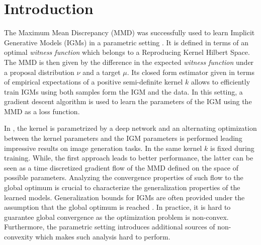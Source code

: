 \section{Introduction}

The Maximum Mean Discrepancy (MMD) \cite{gretton2012kernel} was successfully used to learn Implicit Generative Models (IGMs) in a parametric setting \cite{gen-mmd,Li:2015,Li:2017a,cramer-gan,Binkowski:2018,Arbel:2018}. It is defined in terms of an optimal \textit{witness function} which belongs to a Reproducing Kernel Hilbert Space. The MMD is then given by the difference in the expected \textit{witness function} under a proposal distribution $\nu$ and a target $\mu$. Its closed form estimator given in terms of empirical expectations of a positive semi-definite kernel $k$ allows to efficiently train IGMs using both samples form the IGM and the data. In this setting, a gradient descent algorithm is used to learn the parameters of the IGM using the MMD as a loss function.

In \cite{Li:2017a,Binkowski:2018,Arbel:2018}, the kernel is parametrized by a deep network and an alternating optimization between the kernel parameters and the IGM parameters is performed leading impressive results on image generation tasks. In \cite{gen-mmd,Li:2015} the same kernel $k$ is fixed during training. While, the first approach leads to better performance,  the latter can be seen as a time discretized gradient flow of the MMD defined on the space of possible parameters. Analyzing the convergence properties of such flow to the global optimum is crucial to characterize the generalization properties of the learned models. 
Generalization bounds for IGMs are often provided under the assumption that the global optimum is reached \cite{Uppal:2019}.
In practice, it is hard to guarantee global convergence as the optimization problem is non-convex. Furthermore, the parametric setting introduces additional sources of non-convexity which makes such analysis hard to perform.

